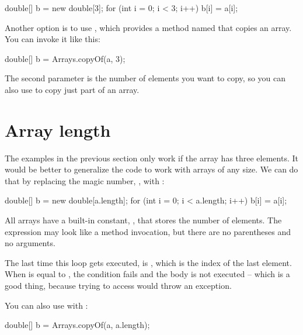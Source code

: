 \begin{code}
double[] b = new double[3];
for (int i = 0; i < 3; i++) {
    b[i] = a[i];
}
\end{code}


Another option is to use , which provides a method named  that copies an array.
You can invoke it like this:

\begin{code}
double[] b = Arrays.copyOf(a, 3);
\end{code}

The second parameter is the number of elements you want to copy, so you can also use  to copy just part of an array.


\section{Array length}


The examples in the previous section only work if the array has three elements.
It would be better to generalize the code to work with arrays of any size.
We can do that by replacing the magic number, , with :

\begin{code}
double[] b = new double[a.length];
for (int i = 0; i < a.length; i++) {
    b[i] = a[i];
}
\end{code}

All arrays have a built-in constant, , that stores the number of elements.
The expression  may look like a method invocation, but there are no parentheses and no arguments.

The last time this loop gets executed,  is , which is the index of the last element.
When  is equal to , the condition fails and the body is not executed -- which is a good thing, because trying to access  would throw an exception.

You can also use  with :

\begin{code}
double[] b = Arrays.copyOf(a, a.length);
\end{code}


